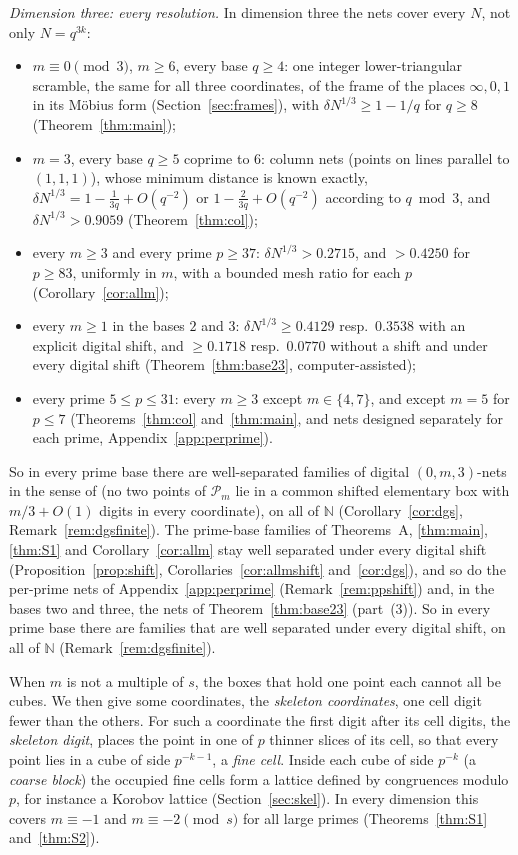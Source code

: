 \documentclass[11pt]{amsart}
\theoremstyle{definition}
\theoremstyle{plain}
\providecommand{\N}{\mathbb{N}}
\begin{document}
\emph{Dimension three: every resolution.} In dimension three the nets cover every $N$, not only $N=q^{3k}$:
\begin{itemize}
\item $m\equiv0\pmod3$, $m\ge6$, every base $q\ge4$: one integer lower-triangular scramble, the same for all three coordinates, of the frame of the places $\infty,0,1$ in its M\"obius form (Section~\ref{sec:frames}), with $\delta N^{1/3}\ge1-1/q$ for $q\ge8$ (Theorem~\ref{thm:main});
\item $m=3$, every base $q\ge5$ coprime to $6$: column nets (points on lines parallel to $(1,1,1)$), whose minimum distance is known exactly, $\delta N^{1/3}=1-\frac1{3q}+O(q^{-2})$ or $1-\frac2{3q}+O(q^{-2})$ according to $q\bmod3$, and $\delta N^{1/3}>0.9059$ (Theorem~\ref{thm:col});
\item every $m\ge3$ and every prime $p\ge37$: $\delta N^{1/3}>0.2715$, and $>0.4250$ for $p\ge83$, uniformly in $m$, with a bounded mesh ratio for each $p$ (Corollary~\ref{cor:allm});
\item every $m\ge1$ in the bases $2$ and $3$: $\delta N^{1/3}\ge0.4129$ resp.\ $0.3538$ with an explicit digital shift, and $\ge0.1718$ resp.\ $0.0770$ without a shift and under every digital shift (Theorem~\ref{thm:base23}, computer-assisted);
\item every prime $5\le p\le31$: every $m\ge3$ except $m\in\{4,7\}$, and except $m=5$ for $p\le7$ (Theorems~\ref{thm:col} and~\ref{thm:main}, and nets designed separately for each prime, Appendix~\ref{app:perprime}).
\end{itemize}
So in every prime base there are well-separated families of digital $(0,m,3)$-nets in the sense of \cite[Def.~3.8]{DGS2} (no two points of $\mathcal P_m$ lie in a common shifted elementary box with $m/3+O(1)$ digits in every coordinate), on all of $\N$ (Corollary~\ref{cor:dgs}, Remark~\ref{rem:dgsfinite}). The prime-base families of Theorems~A, \ref{thm:main}, \ref{thm:S1} and Corollary~\ref{cor:allm} stay well separated under every digital shift (Proposition~\ref{prop:shift}, Corollaries~\ref{cor:allmshift} and~\ref{cor:dgs}), and so do the per-prime nets of Appendix~\ref{app:perprime} (Remark~\ref{rem:ppshift}) and, in the bases two and three, the nets of Theorem~\ref{thm:base23} (part~(3)). So in every prime base there are families that are well separated under every digital shift, on all of $\N$ (Remark~\ref{rem:dgsfinite}).

When $m$ is not a multiple of $s$, the boxes that hold one point each cannot all be cubes. We then give some coordinates, the \emph{skeleton coordinates}, one cell digit fewer than the others. For such a coordinate the first digit after its cell digits, the \emph{skeleton digit}, places the point in one of $p$ thinner slices of its cell, so that every point lies in a cube of side $p^{-k-1}$, a \emph{fine cell}. Inside each cube of side $p^{-k}$ (a \emph{coarse block}) the occupied fine cells form a lattice defined by congruences modulo $p$, for instance a Korobov lattice (Section~\ref{sec:skel}). In every dimension this covers $m\equiv-1$ and $m\equiv-2\pmod s$ for all large primes (Theorems~\ref{thm:S1} and~\ref{thm:S2}).
\end{document}
